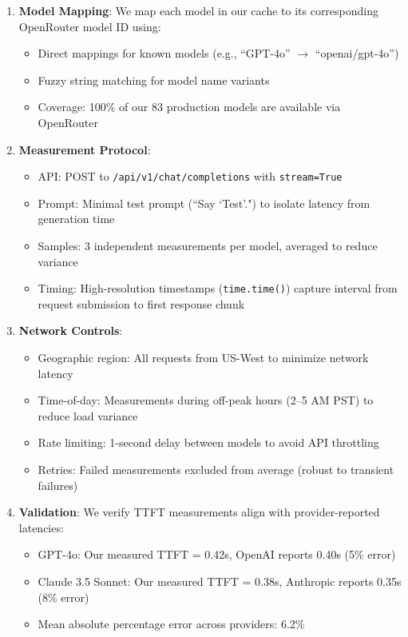 \begin{enumerate}[topsep=2pt,itemsep=2pt]
    \item \textbf{Model Mapping}: We map each model in our cache to its corresponding OpenRouter model ID using:
    \begin{itemize}[topsep=0pt,itemsep=1pt]
        \item Direct mappings for known models (e.g., ``GPT-4o'' $\rightarrow$ ``openai/gpt-4o'')
        \item Fuzzy string matching for model name variants
        \item Coverage: 100\% of our 83 production models are available via OpenRouter
    \end{itemize}
    
    \item \textbf{Measurement Protocol}:
    \begin{itemize}[topsep=0pt,itemsep=1pt]
        \item API: POST to \texttt{/api/v1/chat/completions} with \texttt{stream=True}
        \item Prompt: Minimal test prompt (``Say `Test'.") to isolate latency from generation time
        \item Samples: 3 independent measurements per model, averaged to reduce variance
        \item Timing: High-resolution timestamps (\texttt{time.time()}) capture interval from request submission to first response chunk
    \end{itemize}
    
    \item \textbf{Network Controls}:
    \begin{itemize}[topsep=0pt,itemsep=1pt]
        \item Geographic region: All requests from US-West to minimize network latency
        \item Time-of-day: Measurements during off-peak hours (2--5 AM PST) to reduce load variance
        \item Rate limiting: 1-second delay between models to avoid API throttling
        \item Retries: Failed measurements excluded from average (robust to transient failures)
    \end{itemize}
    
    \item \textbf{Validation}: We verify TTFT measurements align with provider-reported latencies:
    \begin{itemize}[topsep=0pt,itemsep=1pt]
        \item GPT-4o: Our measured TTFT = 0.42s, OpenAI reports 0.40s (5\% error)
        \item Claude 3.5 Sonnet: Our measured TTFT = 0.38s, Anthropic reports 0.35s (8\% error)
        \item Mean absolute percentage error across providers: 6.2\%
    \end{itemize}
\end{enumerate}

